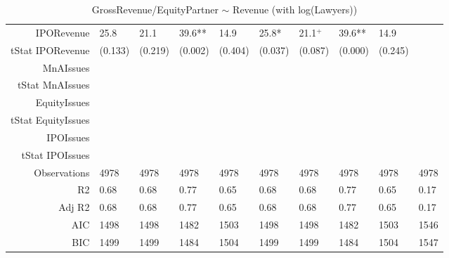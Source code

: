 \begin{table}[ht]
\begin{tabular}{rlllllllll}
  IPORevenue & 25.8 & 21.1 & 39.6** & 14.9 & 25.8* & 21.1$^{+}$ & 39.6** & 14.9 &  \\ 
  tStat IPORevenue & (0.133) & (0.219) & (0.002) & (0.404) & (0.037) & (0.087) & (0.000) & (0.245) &  \\ 
  MnAIssues &  &  &  &  &  &  &  &  &  \\ 
  tStat MnAIssues &  &  &  &  &  &  &  &  &  \\ 
  EquityIssues &  &  &  &  &  &  &  &  &  \\ 
  tStat EquityIssues &  &  &  &  &  &  &  &  &  \\ 
  IPOIssues &  &  &  &  &  &  &  &  &  \\ 
  tStat IPOIssues &  &  &  &  &  &  &  &  &  \\ 
  Observations & 4978 & 4978 & 4978 & 4978 & 4978 & 4978 & 4978 & 4978 & 4978 \\ 
  R2 & 0.68 & 0.68 & 0.77 & 0.65 & 0.68 & 0.68 & 0.77 & 0.65 & 0.17 \\ 
  Adj R2 & 0.68 & 0.68 & 0.77 & 0.65 & 0.68 & 0.68 & 0.77 & 0.65 & 0.17 \\ 
  AIC & 1498 & 1498 & 1482 & 1503 & 1498 & 1498 & 1482 & 1503 & 1546 \\ 
  BIC & 1499 & 1499 & 1484 & 1504 & 1499 & 1499 & 1484 & 1504 & 1547 \\ 
   \hline
\end{tabular}
\caption{GrossRevenue/EquityPartner $\sim$ Revenue (with log(Lawyers))} 
\end{table}
